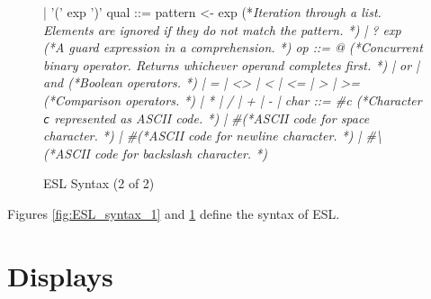 \documentclass[5p,times]{elsarticle}
\begin{document}
\begin{figure}
\begin{ESL}
        |  '(' exp ')' 
qual    ::= pattern <- exp                                      (*\rmfamily\it Iteration through a list. Elements are ignored if they do not match the pattern. *)
        |  ? exp                                               (*\rmfamily\it A guard expression in a comprehension. *)
op      ::= @                                                   (*\rmfamily\it Concurrent binary operator. Returns whichever operand completes first. *)
        | or | and                                             (*\rmfamily\it Boolean operators. *)
        | = | <> | < | <= | > | >=                             (*\rmfamily\it Comparison operators. *)
        | * | / | + | - | %
char    ::= #c                                                  (*\rmfamily\it Character {\tt c} represented as ASCII code. *)
        |   #\space                                            (*\rmfamily\it ASCII code for space character. *)
        |   #\newline                                          (*\rmfamily\it ASCII code for newline character. *)
        |   #\backslash                                        (*\rmfamily\it ASCII code for backslash character. *)
\end{ESL}
\caption{ESL Syntax (2 of 2)}
\label{fig:ESL_syntax_2}
\end{figure}

Figures \ref{fig:ESL_syntax_1} and \ref{fig:ESL_syntax_2} define the syntax of ESL.

\section{Displays}

\label{sec:display_definitions}
\end{document}
